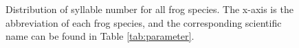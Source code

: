 \begin{figure}[htb!] %
\caption[Distribution of syllable number for all frog species]{Distribution of syllable number for all frog species. The x-axis is the abbreviation of each frog species, and the corresponding scientific name can be found in Table \ref{tab:parameter}.}
\label{fig:Ch5_syllable} 
\end{figure}





